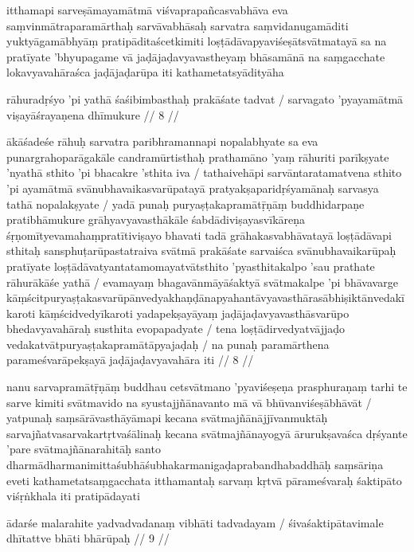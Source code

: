 itthamapi sarveṣāmayamātmā viśvaprapañcasvabhāva eva saṃvinmātraparamārthaḥ sarvāvabhāsaḥ sarvatra saṃvidanugamāditi yuktyāgamābhyāṃ pratipāditaścetkimiti loṣṭādāvapyaviśeṣātsvātmatayā sa na pratīyate 'bhyupagame vā jaḍājaḍavyavastheyaṃ bhāsamānā na saṃgacchate lokavyavahāraśca jaḍājaḍarūpa iti kathametatsyādityāha

rāhuradṛśyo 'pi yathā śaśibimbasthaḥ prakāśate tadvat  /
sarvagato 'pyayamātmā viṣayāśrayaṇena dhīmukure  // 8  //

ākāśadeśe rāhuḥ sarvatra paribhramannapi nopalabhyate sa eva punargrahoparāgakāle candramūrtisthaḥ prathamāno 'yaṃ rāhuriti parīkṣyate 'nyathā sthito 'pi bhacakre 'sthita iva  / tathaivehāpi sarvāntaratamatvena sthito 'pi ayamātmā svānubhavaikasvarūpatayā pratyakṣaparidṛśyamānaḥ sarvasya tathā nopalakṣyate  / yadā punaḥ puryaṣṭakapramātṝṇāṃ buddhidarpaṇe pratibhāmukure grāhyavyavasthākāle śabdādiviṣayasvīkāreṇa śṛṇomītyevamahaṃpratītiviṣayo bhavati tadā grāhakasvabhāvatayā loṣṭādāvapi sthitaḥ sansphuṭarūpastatraiva svātmā prakāśate sarvaiśca svānubhavaikarūpaḥ pratīyate loṣṭādāvatyantatamomayatvātsthito 'pyasthitakalpo 'sau prathate rāhurākāśe yathā  / evamayaṃ bhagavānmāyāśaktyā svātmakalpe 'pi bhāvavarge kāṃścitpuryaṣṭakasvarūpānvedyakhaṇḍānapyahantāvyavasthārasābhiṣiktānvedakīkaroti kāṃścidvedyīkaroti yadapekṣayāyaṃ jaḍājaḍavyavasthāsvarūpo bhedavyavahāraḥ susthita evopapadyate  / tena loṣṭādirvedyatvājjaḍo vedakatvātpuryaṣṭakapramātāpyajaḍaḥ  / na punaḥ paramārthena parameśvarāpekṣayā jaḍājaḍavyavahāra iti  // 8  //

nanu sarvapramātṝṇāṃ buddhau cetsvātmano 'pyaviśeṣeṇa prasphuraṇaṃ tarhi te sarve kimiti svātmavido na syustajjñānavanto mā vā bhūvanviśeṣābhāvāt  / yatpunaḥ saṃsārāvasthāyāmapi kecana svātmajñānājjīvanmuktāḥ sarvajñatvasarvakartṛtvaśālinaḥ kecana svātmajñānayogyā ārurukṣavaśca dṛśyante 'pare svātmajñānarahitāḥ santo dharmādharmanimittaśubhāśubhakarmanigaḍaprabandhabaddhāḥ saṃsāriṇa eveti kathametatsaṃgacchata itthamantaḥ sarvaṃ kṛtvā pārameśvaraḥ śaktipāto viśṛṅkhala iti pratipādayati

ādarśe malarahite yadvadvadanaṃ vibhāti tadvadayam  /
śivaśaktipātavimale dhītattve bhāti bhārūpaḥ  // 9  //

